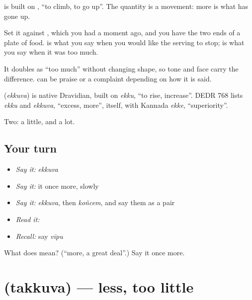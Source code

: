  is built on , \textquotedblleft{}to climb, to go up\textquotedblright{}. The quantity is a movement: more is what has gone up.

Set it against , which you had a moment ago, and you have the two ends of a plate of food.  is what you say when you would like the serving to stop;  is what you say when it was too much.

It doubles as \textquotedblleft{}too much\textquotedblright{} without changing shape, so tone and face carry the difference.   can be praise or a complaint depending on how it is said.

\begin{cousinweb}
\textbf{} (\emph{ekkuva}) is native Dravidian, built on \emph{ekku}, \textquotedblleft{}to rise, increase\textquotedblright{}. DEDR 768 lists \emph{ekku} and \emph{ekkuva}, \textquotedblleft{}excess, more\textquotedblright{}, itself, with Kannada \emph{ekke}, \textquotedblleft{}superiority\textquotedblright{}.
\end{cousinweb}

\begin{grammarlens}[title={What you've built}]
Two: a little, and a lot.
\end{grammarlens}

\subsection*{Your turn}
\begin{itemize}
\raggedright
  \item \emph{Say it:} \emph{ekkuva}
  \item \emph{Say it:} it once more, slowly
  \item \emph{Say it:} \emph{ekkuva}, then \emph{koñcem}, and say them as a pair
  \item \emph{Read it:} \textbf{}
  \item \emph{Recall:} say \emph{vīpu}
\end{itemize}

\begin{tcolorbox}[breakable,colback=teal!4,colframe=teal!35!black,title={Before you move on}]
What does  mean? (\textquotedblleft{}more, a great deal\textquotedblright{}.) Say it once more.
\end{tcolorbox}
\section[\texorpdfstring{\te{తక్కువ} (takkuva)}{తక్కువ (takkuva)}]{ (takkuva) — less, too little}

